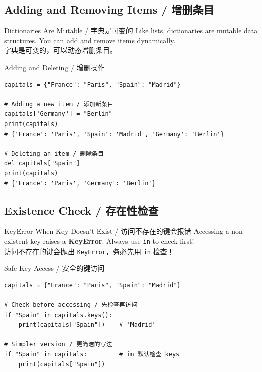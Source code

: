 \documentclass[11pt,a4paper]{report}
\let\oldtexttt\texttt
\renewcommand{\texttt}[1]{\textcolor{mainblue}{\oldtexttt{#1}}}
\begin{document}
\subsection{Adding and Removing Items / 增删条目}

\begin{concept}{Dictionaries Are Mutable / 字典是可变的}
    Like lists, dictionaries are mutable data structures. You can add and remove items dynamically. \\
    字典是可变的，可以动态增删条目。
\end{concept}

\begin{examplebox}{Adding and Deleting / 增删操作}
\begin{lstlisting}
capitals = {"France": "Paris", "Spain": "Madrid"}

# Adding a new item / 添加新条目
capitals['Germany'] = "Berlin"
print(capitals)
# {'France': 'Paris', 'Spain': 'Madrid', 'Germany': 'Berlin'}

# Deleting an item / 删除条目
del capitals["Spain"]
print(capitals)
# {'France': 'Paris', 'Germany': 'Berlin'}
\end{lstlisting}
\end{examplebox}

\subsection{Existence Check / 存在性检查}

\begin{warning}{KeyError When Key Doesn't Exist / 访问不存在的键会报错}
    Accessing a non-existent key raises a \textbf{KeyError}. Always use \texttt{in} to check first! \\
    访问不存在的键会抛出 \texttt{KeyError}，务必先用 \texttt{in} 检查！
\end{warning}

\begin{examplebox}{Safe Key Access / 安全的键访问}
\begin{lstlisting}
capitals = {"France": "Paris", "Spain": "Madrid"}

# Check before accessing / 先检查再访问
if "Spain" in capitals.keys():
    print(capitals["Spain"])    # 'Madrid'

# Simpler version / 更简洁的写法
if "Spain" in capitals:         # in 默认检查 keys
    print(capitals["Spain"])
\end{lstlisting}
\end{examplebox}
\end{document}
